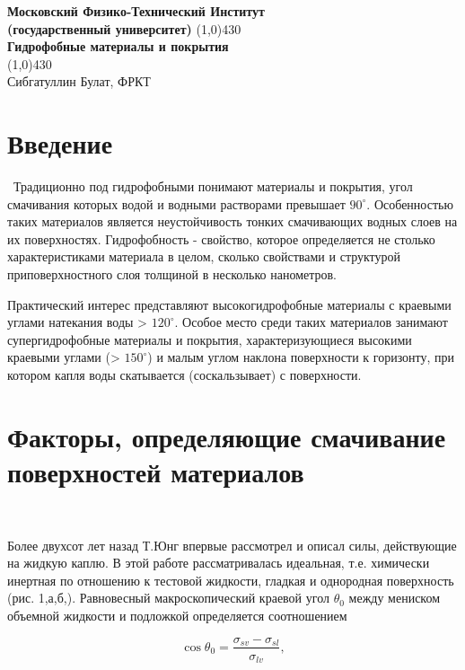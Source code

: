 \documentclass[11pt]{article}
\begin{document}
\begin{titlepage}

\begin{center}
\large\textbf{Московский Физико-Технический Институт}\\
\large\textbf{(государственный университет)}
\vfill
\line(1,0){430}\\[1mm]
\huge\textbf{Гидрофобные материалы и покрытия}\\
\line(1,0){430}\\[1mm]
\vfill
\large Сибгатуллин Булат, ФРКТ\\
\end{center}

\end{titlepage}

\section*{Введение}\
\indent Традиционно под гидрофобными понимают материалы и покрытия, угол смачивания которых водой и водными растворами превышает $90^{\circ}$. Особенностью таких материалов является неустойчивость тонких смачивающих водных слоев на их поверхностях. Гидрофобность - свойство, которое определяется не столько характеристиками материала в целом, сколько свойствами и структурой приповерхностного слоя толщиной в несколько нанометров.

\indent Практический интерес представляют высокогидрофобные материалы с краевыми углами натекания воды > $120^{\circ}$. Особое место среди таких материалов занимают супергидрофобные материалы и покрытия, характеризующиеся высокими краевыми углами (> $150^{\circ}$) и малым углом наклона поверхности к горизонту, при котором капля воды скатывается (соскальзывает) с поверхности.

\section*{Факторы, определяющие смачивание поверхностей материалов}\

Более двухсот лет назад Т.Юнг впервые рассмотрел и описал силы, действующие на жидкую каплю. В этой работе рассматривалась идеальная, т.е. химически инертная по отношению к тестовой жидкости, гладкая и однородная поверхность (рис. 1,а,б,). Равновесный макроскопический краевой угол $\theta_0$ между мениском объемной жидкости и подложкой определяется соотношением

\begin{equation}
\cos \theta_0 = \frac{\sigma_{sv} - \sigma_{sl}}{\sigma_{lv}},
\end{equation}
\end{document}
